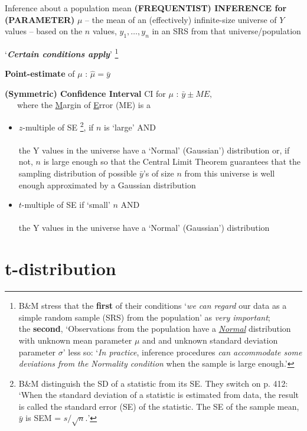 \documentclass{beamer}\usepackage[]{graphicx}\usepackage[]{color}
\begin{document}
\begin{frame}{Inference about a population mean}
\textbf{(FREQUENTIST) INFERENCE for (PARAMETER)} $\mu$ -- the mean of an (effectively) infinite-size universe of $Y$ values --
based on the $n$ values, $y_1, \dots, y_n$ in an  SRS from that universe/population


`\textbf{\textit{Certain conditions apply}}'  \footnote{ B\&M stress that the \textbf{first} of their conditions `\textit{we can regard} our data as a simple random sample (SRS) from  the
	population' as \textit{very important};\\ { \scriptsize the \textbf{second}, `Observations from the population have a \textit{\underline{Normal}} distribution with unknown mean parameter $\mu$ and and unknown standard deviation parameter $\sigma$' less so: `\textit{In
			practice}, inference procedures \textit{can accommodate some deviations from
			the Normality condition} when the sample is large enough.'}}

\textbf{Point-estimate} of $\mu$  :  $\hat{\mu} = \bar{y}$  

\textbf{(Symmetric) Confidence Interval} CI for $\mu$ : $\bar{y} \pm ME,$\\
\ \  \  where the \underline{M}argin of \underline{E}rror (ME) is a 
\begin{itemize}
	\item
	$z$-multiple of SE \footnote{B\&M distinguish the SD of a statistic from its SE. They switch on p. 412: `When the standard deviation of a statistic is estimated from data, the result
		is called the standard error (SE) of the statistic. The SE  of the sample mean, $\bar{y}$
		is SEM = $s/\sqrt{n}.$'}, if $n$ is `large' AND \\ \ \\
	the Y values in the universe have a  `Normal' (Gaussian')  distribution or, if not, $n$ is large enough so that the Central Limit Theorem guarantees that the sampling distribution of possible $\bar{y}$'s of size $n$ from this universe is well enough approximated by a Gaussian distribution
	\item
	$t$-multiple of SE if `small' $n$ AND \\ \ \\
	the Y values in the universe have a  `Normal' (Gaussian')  distribution
\end{itemize}
\end{frame}




\section{t-distribution}
\end{document}
